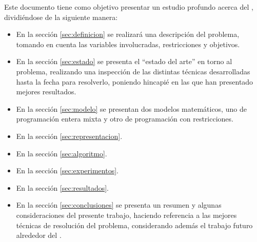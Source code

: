 Este documento tiene como objetivo presentar un estudio profundo acerca del \mrp, dividiéndose de la siguiente manera:
\begin{itemize}
	\item En la sección \ref{sec:definicion} se realizará una descripción del problema, tomando en cuenta las variables involucradas, restricciones y objetivos.
	\item En la sección \ref{sec:estado} se presenta el ``estado del arte'' en torno al problema, realizando una inspección de las distintas técnicas desarrolladas hasta la fecha para resolverlo, poniendo hincapié en las que han presentado mejores resultados. 
	\item En la sección \ref{sec:modelo} se presentan dos modelos matemáticos, uno de programación entera mixta y otro de programación con restricciones.
	\item En la sección \ref{sec:representacion}.
	\item En la sección \ref{sec:algoritmo}.
	\item En la sección \ref{sec:experimentos}.
	\item En la sección \ref{sec:resultados}.
	\item En la sección \ref{sec:conclusiones} se presenta un resumen y algunas consideraciones del presente trabajo, haciendo referencia a las mejores técnicas de resolución del problema, considerando además el trabajo futuro alrededor del \mrp.
\end{itemize}
  

